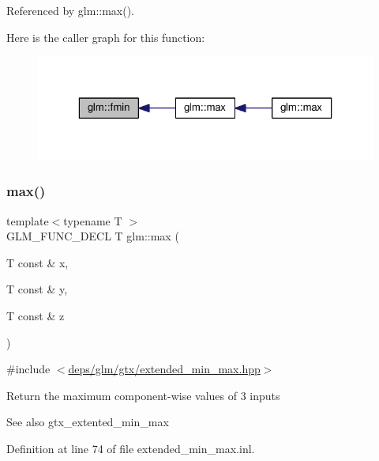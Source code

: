 Referenced by glm\+::max().

Here is the caller graph for this function\+:
\nopagebreak
\begin{figure}[H]
\begin{center}
\leavevmode
\includegraphics[width=323pt]{df/d72/group__gtx__extended__min__max_ga7c42e93cd778c9181d1cdeea4d3e43bd_icgraph}
\end{center}
\end{figure}
\mbox{\label{group__gtx__extended__min__max_ga04991ccb9865c4c4e58488cfb209ce69}} 
\subsubsection{\texorpdfstring{max()}{max()}\hspace{0.1cm}{\footnotesize\ttfamily [1/6]}}
{\footnotesize\ttfamily template$<$typename T $>$ \\
G\+L\+M\+\_\+\+F\+U\+N\+C\+\_\+\+D\+E\+CL T glm\+::max (\begin{DoxyParamCaption}\item[{T const \&}]{x,  }\item[{T const \&}]{y,  }\item[{T const \&}]{z }\end{DoxyParamCaption})}



{\ttfamily \#include $<$\hyperlink{extended__min__max_8hpp}{deps/glm/gtx/extended\+\_\+min\+\_\+max.\+hpp}$>$}

Return the maximum component-\/wise values of 3 inputs \begin{DoxySeeAlso}{See also}
gtx\+\_\+extented\+\_\+min\+\_\+max 
\end{DoxySeeAlso}


Definition at line 74 of file extended\+\_\+min\+\_\+max.\+inl.

